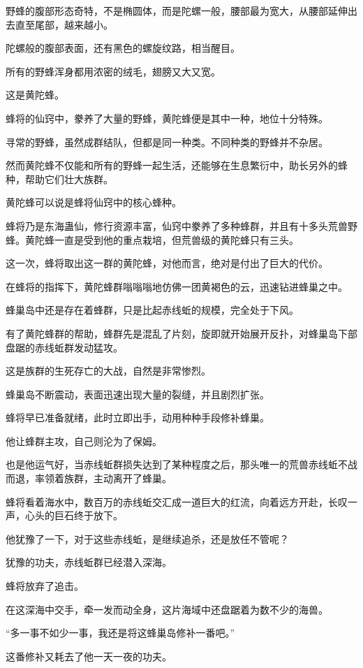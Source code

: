 \begin{this_body}
野蜂的腹部形态奇特，不是椭圆体，而是陀螺一般，腰部最为宽大，从腰部延伸出去直至尾部，越来越小。

陀螺般的腹部表面，还有黑色的螺旋纹路，相当醒目。

所有的野蜂浑身都用浓密的绒毛，翅膀又大又宽。

这是黄陀蜂。

蜂将的仙窍中，豢养了大量的野蜂，黄陀蜂便是其中一种，地位十分特殊。

寻常的野蜂，虽然成群结队，但都是同一种类。不同种类的野蜂并不杂居。

然而黄陀蜂不仅能和所有的野蜂一起生活，还能够在生息繁衍中，助长另外的蜂种，帮助它们壮大族群。

黄陀蜂可以说是蜂将仙窍中的核心蜂种。

蜂将乃是东海蛊仙，修行资源丰富，仙窍中豢养了多种蜂群，并且有十多头荒兽野蜂。黄陀蜂一直是受到他的重点栽培，但荒兽级的黄陀蜂只有三头。

这一次，蜂将取出这一群的黄陀蜂，对他而言，绝对是付出了巨大的代价。

在蜂将的指挥下，黄陀蜂群嗡嗡嗡地仿佛一团黄褐色的云，迅速钻进蜂巢之中。

蜂巢岛中还是存在着蜂群，只是比起赤线蚯的规模，完全处于下风。

有了黄陀蜂群的帮助，蜂群先是混乱了片刻，旋即就开始展开反扑，对蜂巢岛下部盘踞的赤线蚯群发动猛攻。

这是族群的生死存亡的大战，自然是非常惨烈。

蜂巢岛不断震动，表面迅速出现大量的裂缝，并且剧烈扩张。

蜂将早已准备就绪，此时立即出手，动用种种手段修补蜂巢。

他让蜂群主攻，自己则沦为了保姆。

也是他运气好，当赤线蚯群损失达到了某种程度之后，那头唯一的荒兽赤线蚯不战而退，率领着族群，主动离开了蜂巢。

蜂将看着海水中，数百万的赤线蚯交汇成一道巨大的红流，向着远方开赴，长叹一声，心头的巨石终于放下。

他犹豫了一下，对于这些赤线蚯，是继续追杀，还是放任不管呢？

犹豫的功夫，赤线蚯群已经潜入深海。

蜂将放弃了追击。

在这深海中交手，牵一发而动全身，这片海域中还盘踞着为数不少的海兽。

“多一事不如少一事，我还是将这蜂巢岛修补一番吧。”

这番修补又耗去了他一天一夜的功夫。


\end{this_body}
